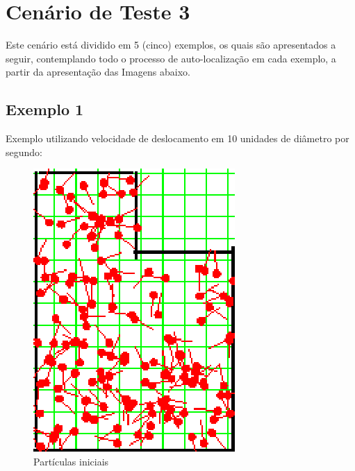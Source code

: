\section{Cenário de Teste 3}

Este cenário está dividido em 5 (cinco) exemplos, os quais são apresentados a seguir, contemplando todo o processo de auto-localização
em cada exemplo, a partir da apresentação das Imagens abaixo.

\subsection{Exemplo 1}

Exemplo utilizando velocidade de deslocamento em 10 unidades de diâmetro por segundo:

\begin{figure}[H]
  \centering
  \includegraphics[scale=1]{figuras/cen3_ex1/1.eps}
  \caption[Partículas Iniciais]{Partículas iniciais}
  \label{img:cen3_ex1_1}
\end{figure}

